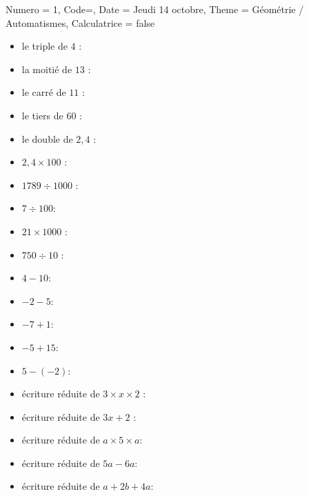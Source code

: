 \documentclass[11pt]{article}
\newcommand{\ligne}{{\color{gray!60}\hrulefill}}
\begin{document}
\begin{Maquette}[IE]{
        Numero = 1, Code={}, Date = Jeudi 14 octobre, Theme = Géométrie / Automatismes, Calculatrice = false
    }
    \vspace{.5cm}
    \begin{exercice}
        \begin{multicols}{2}
            \begin{itemize}[itemsep=10pt]
                \item le triple de $4$ : \ligne
                \item la moitié de $13$ : \ligne
                \item le carré de $11$ : \ligne
                \item le tiers de $60$ : \ligne
                \item le double de $2,4$ : \ligne
                \item $2,4 \times 100$ : \ligne
                \item $1789 \div 1000$ : \ligne
                \item $7 \div 100$: \ligne
                \item $21 \times 1000$ : \ligne
                \item $750 \div 10$ : \ligne
                \item $4-10$: \ligne
                \item $-2-5$: \ligne
                \item $-7+1$: \ligne
                \item $-5+15$: \ligne
                \item $5 - (-2)$: \ligne
                \item écriture réduite de $3 \times x \times 2 $ : \ligne
                \item écriture réduite de $3 x + 2$ : \ligne
                \item écriture réduite de $a \times 5 \times a$: \ligne
                \item écriture réduite de $5a - 6a$: \ligne
                \item écriture réduite de $a+2b+4a$: \ligne
            \end{itemize}
        \end{multicols}
    \end{exercice}
\end{Maquette}
\end{document}

